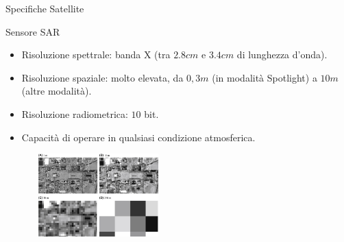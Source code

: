\documentclass[xcolor=table]{beamer}
\begin{document}
\begin{frame}{Specifiche Satellite}

\begin{block}{Sensore SAR}

    \begin{itemize}
        \item Risoluzione spettrale: banda X (tra $2.8cm $ e $3.4 cm$ di lunghezza d'onda).
        \item Risoluzione spaziale: molto elevata, da $0,3m$ (in modalità Spotlight) a $10m$ (altre modalità).
        \item Risoluzione radiometrica: $10$ bit.    
        \item Capacità di operare in qualsiasi condizione atmosferica.
    \end{itemize}
        
    \end{block}

    \begin{figure}
        \centering
        \includegraphics[width=0.45\textwidth,height=3.2cm]{risspaz.jpg}
    \end{figure}
    
\end{frame}
\end{document}

